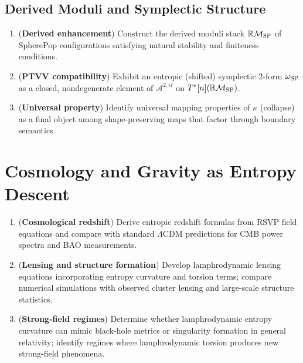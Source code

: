 \documentclass[12pt]{article}
\theoremstyle{plain}
\theoremstyle{definition}
\theoremstyle{remark}
\begin{document}
\subsection{Derived Moduli and Symplectic Structure}

\begin{enumerate}
    \item ({\bf Derived enhancement})
    Construct the derived moduli stack $\mathbb{R}\mathcal{M}_{\rm SP}$ of
    SpherePop configurations satisfying natural stability and finiteness
    conditions.

    \item ({\bf PTVV compatibility})
    Exhibit an entropic (shifted) symplectic 2-form $\omega_{\rm SP}$ as a
    closed, nondegenerate element of $\mathcal{A}^{2,cl}$ on
    $T^{\ast}[n](\mathbb{R}\mathcal{M}_{\rm SP})$.

    \item ({\bf Universal property})
    Identify universal mapping properties of $\kappa$ (collapse) as a final
    object among shape-preserving maps that factor through boundary semantics.
\end{enumerate}


\section{Cosmology and Gravity as Entropy Descent}

\begin{enumerate}
    \item ({\bf Cosmological redshift})
    Derive entropic redshift formulas from RSVP field equations and compare
    with standard $\Lambda$CDM predictions for CMB power spectra and BAO
    measurements.

    \item ({\bf Lensing and structure formation})
    Develop lamphrodynamic lensing equations incorporating entropy curvature
    and torsion terms; compare numerical simulations with observed cluster
    lensing and large-scale structure statistics.

    \item ({\bf Strong-field regimes})
    Determine whether lamphrodynamic entropy curvature can mimic black-hole
    metrics or singularity formation in general relativity; identify regimes
    where lamphrodynamic torsion produces new strong-field phenomena.
\end{enumerate}
\end{document}

